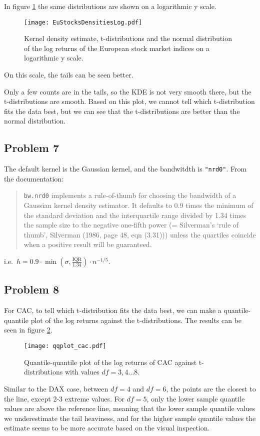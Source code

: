 \documentclass{article}
\begin{document}
In figure \ref{fig:EuStocksDensitiesLog} the same distributions are shown on a logarithmic y scale.
\begin{figure}[htbp]
    \centering
    \texttt{[image: EuStocksDensitiesLog.pdf]}
    \caption{Kernel density estimate, t-distributions and the normal distribution
        of the log returns of the European stock market indices on a logarithmic y scale.}
    \label{fig:EuStocksDensitiesLog}
\end{figure}
On this scale, the tails can be seen better.

Only a few counts are in the tails, so the KDE is not very smooth there,
but the t-distributions are smooth. Based on this plot,
we cannot tell which t-distribution fits the data best,
but we can see that the t-distributions are better than the normal distribution.

\subsection{Problem 7}
The default kernel is the Gaussian kernel, and the bandwitdth is \texttt{"nrd0"}. From the documentation:
\begin{quote}
    \texttt{bw.nrd0} implements a rule-of-thumb for choosing the bandwidth of a Gaussian kernel density estimator.
    It defaults to 0.9 times the minimum of the standard deviation
    and the interquartile range divided by 1.34 times
    the sample size to the negative one-fifth power
    (= Silverman's ‘rule of thumb’, Silverman (1986, page 48, eqn (3.31)))
    unless the quartiles coincide when a positive result will be guaranteed.
\end{quote}
i.e.\ $h = 0.9 \cdot \min\left( \sigma, \frac{\mathrm{IQR}}{1.34} \right) \cdot n^{-1/5}$.

\subsection{Problem 8}
For CAC, to tell which t-distribution fits the data best,
we can make a quantile-quantile plot of the log returns against the t-distributions.
The results can be seen in figure \ref{fig:qqplot_cac}.
\begin{figure}[htbp]
    \centering
    \texttt{[image: qqplot\_cac.pdf]}
    \caption{Quantile-quantile plot of the log returns of CAC against t-distributions with values
        $df=3, 4 \ldots 8$.}
    \label{fig:qqplot_cac}
\end{figure}
Similar to the DAX case, between $df=4$ and $df=6$,
the points are the closest to the line, except 2-3 extreme values. For $df=5$,
only the lower sample quantile values are above the reference line,
meaning that the lower sample quantile values we underestimate the tail heaviness,
and for the higher sample quantile values the estimate seems to be more accurate based on the visual inspection.
\end{document}
